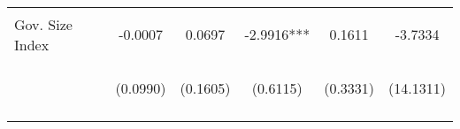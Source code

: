 \begin{center}
\begin{tabular}{lccccc}
\noalign{\smallskip}Gov. Size Index & \begin{scriptsize}-0.0007\end{scriptsize} & \begin{scriptsize}0.0697\end{scriptsize} & \begin{scriptsize}-2.9916***\end{scriptsize} & \begin{scriptsize}0.1611\end{scriptsize} & \begin{scriptsize}-3.7334\end{scriptsize}\\
 & \begin{scriptsize}(0.0990)\end{scriptsize} & \begin{scriptsize}(0.1605)\end{scriptsize} & \begin{scriptsize}(0.6115)\end{scriptsize} & \begin{scriptsize}(0.3331)\end{scriptsize} & \begin{scriptsize}(14.1311)\end{scriptsize}\\
\noalign{\smallskip}\hline\end{tabular}\\
\end{center}
